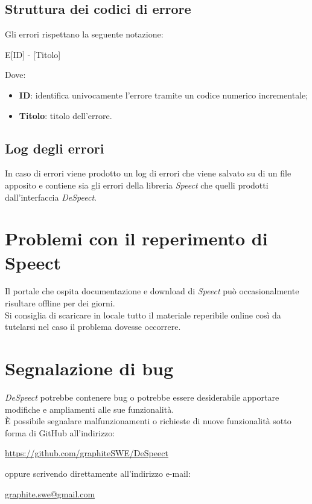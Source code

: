 \documentclass[openany,12pt,a4paper]{report}
\begin{document}
	\subsection{Struttura dei codici di errore}
	Gli errori rispettano la seguente notazione:
	
	\begin{center}
		E[ID] - [Titolo]
	\end{center}
	
	Dove:
	
	\begin{itemize}
		
		\item \textbf{ID}: identifica univocamente l'errore tramite un codice numerico incrementale;
		
		\item \textbf{Titolo}: titolo dell'errore.
	\end{itemize}
	
	\subsection{Log degli errori}
	In caso di errori viene prodotto un log di errori che viene salvato su di un file apposito e contiene sia gli errori della libreria \textit{Speect} che quelli prodotti dall'interfaccia \textit{DeSpeect}.
	
	\section{Problemi con il reperimento di Speect}	
	Il portale che ospita documentazione e download di \textit{Speect} può occasionalmente risultare offline per dei giorni.\\
	Si consiglia di scaricare in locale  tutto il materiale reperibile online così da tutelarsi nel caso il problema dovesse occorrere.
	
	\section{Segnalazione di bug}
	
	\textit{DeSpeect} potrebbe contenere bug o potrebbe essere desiderabile apportare modifiche e ampliamenti alle sue funzionalità. \\ È possibile segnalare malfunzionamenti o richieste di nuove funzionalità sotto forma di GitHub  all’indirizzo:
	\begin{center}
		\url{https://github.com/graphiteSWE/DeSpeect}
	\end{center}
  oppure scrivendo direttamente all'indirizzo e-mail:
  \begin{center}
  	\url{graphite.swe@gmail.com}
  \end{center}
	
	\appendix
	
	\printglossary[style=glossaryStyle, nonumberlist]
	
\end{document}
